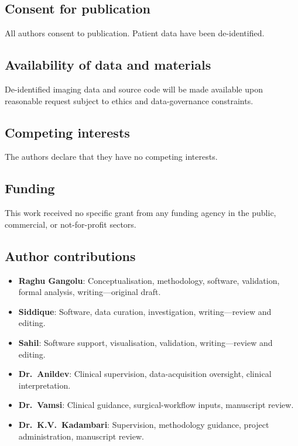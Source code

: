 \documentclass[10pt,a4paper]{article}
\begin{document}
\subsection*{Consent for publication}
All authors consent to publication.
Patient data have been de-identified.

\subsection*{Availability of data and materials}
De-identified imaging data and source code will be made available upon
reasonable request subject to ethics and data-governance constraints.

\subsection*{Competing interests}
The authors declare that they have no competing interests.

\subsection*{Funding}
This work received no specific grant from any funding agency in the
public, commercial, or not-for-profit sectors.

\subsection*{Author contributions}
\begin{itemize}
  \item \textbf{Raghu Gangolu}: Conceptualisation, methodology,
        software, validation, formal analysis,
        writing---original draft.
  \item \textbf{Siddique}: Software, data curation, investigation,
        writing---review and editing.
  \item \textbf{Sahil}: Software support, visualisation, validation,
        writing---review and editing.
  \item \textbf{Dr.\ Anildev}: Clinical supervision, data-acquisition
        oversight, clinical interpretation.
  \item \textbf{Dr.\ Vamsi}: Clinical guidance, surgical-workflow
        inputs, manuscript review.
  \item \textbf{Dr.\ K.V.\ Kadambari}: Supervision, methodology
        guidance, project administration, manuscript review.
\end{itemize}
\end{document}
